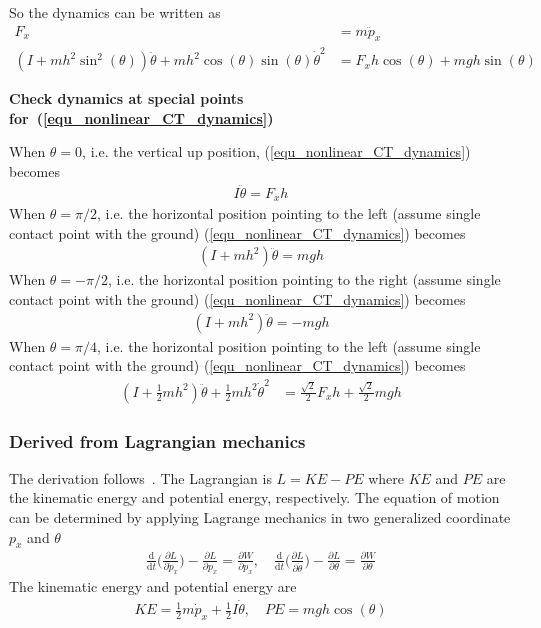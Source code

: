 \documentclass[12pt]{article}
\begin{document}
So the dynamics can be written as 
\begin{align}
F_x &= m\ddot{p}_x \\
(I+mh^2\sin^2(\theta))\ddot{\theta}+mh^2\cos(\theta)\sin(\theta)\dot{\theta}^2
&= F_xh\cos(\theta) + mgh\sin(\theta)
\label{equ_nonlinear_CT_dynamics}
\end{align}

\textbf{Check dynamics at special points 
for~(\ref{equ_nonlinear_CT_dynamics})}

When $\theta=0$, i.e. the vertical up position,
(\ref{equ_nonlinear_CT_dynamics}) becomes
\begin{align}
I\ddot{\theta} = F_xh
\end{align}
When $\theta=\pi/2$, i.e. the horizontal position pointing to the left
(assume single contact point with the ground)
(\ref{equ_nonlinear_CT_dynamics}) becomes
\begin{align}
(I+mh^2)\ddot{\theta} = mgh
\end{align}
When $\theta=-\pi/2$, i.e. the horizontal position pointing to the right
(assume single contact point with the ground)
(\ref{equ_nonlinear_CT_dynamics}) becomes
\begin{align}
(I+mh^2)\ddot{\theta} = -mgh
\end{align}
When $\theta=\pi/4$, i.e. the horizontal position pointing to the left
(assume single contact point with the ground)
(\ref{equ_nonlinear_CT_dynamics}) becomes
\begin{align}
(I+\frac{1}{2}mh^2)\ddot{\theta}+\frac{1}{2}mh^2\dot{\theta}^2
&= \frac{\sqrt{2}}{2}F_xh + \frac{\sqrt{2}}{2}mgh
\end{align}

\subsubsection{Derived from Lagrangian mechanics}
The derivation follows~\cite{peacock_2007_mit_lagrange}.
The Lagrangian is $L=KE-PE$ where $KE$ and $PE$ are the
kinematic energy and potential energy, respectively.
The equation of motion can be determined by applying
Lagrange mechanics in two generalized coordinate $p_x$ and $\theta$
\begin{align}
\frac{\mathrm{d}}{\mathrm{d}t}\bigg(
\frac{\partial L}{\partial \dot{p}_x}\bigg)
-\frac{\partial L}{\partial p_x}=
\frac{\partial W}{\partial p_x}, \quad
\frac{\mathrm{d}}{\mathrm{d}t}\bigg(
\frac{\partial L}{\partial \dot{\theta}}\bigg)
-\frac{\partial L}{\partial \theta}=
\frac{\partial W}{\partial \theta}
\end{align}
The kinematic energy and potential energy are
\begin{align}
KE = \frac{1}{2}m\dot{p}_x+\frac{1}{2}I\dot{\theta},\quad
PE = mgh\cos(\theta)
\end{align}



{}
\end{document}
